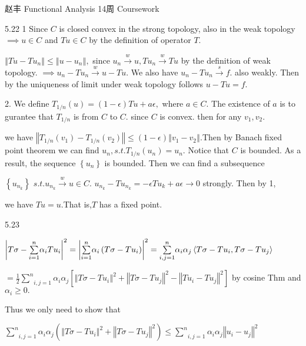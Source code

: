 \documentclass{article}
\begin{document}
\bigskip \bigskip \bigskip 赵丰\qquad \qquad
Functional Analysis 14周 Coursework

5.22 1 Since $C$ is closed convex in the strong topology, also in the weak
topology$\implies u\in C$ and $Tu\in C$ by the definition of operator $T.$

$\left\Vert Tu-Tu_{n}\right\Vert \leq \left\Vert u-u_{n}\right\Vert ,$ since 
$u_{n}\overset{w}{\rightarrow }u,Tu_{n}\overset{w}{\rightarrow }Tu$ by the
definition of weak topology. $\implies u_{n}-Tu_{n}\overset{w}{\rightarrow }%
u-Tu.$ We also have $u_{n}-Tu_{n}\overset{s}{\rightarrow }f.$ also weakly.
Then by the uniqueness of limit under weak topology follows $u-Tu=f.$

2. We define $T_{1/n}\left( u\right) =\left( 1-\epsilon \right) Tu+a\epsilon
,$ where $a\in C.$ The existence of $a$ is to gurantee that $T_{1/n}$ is
from $C$ to $C.$ since $C$ is convex. then for any $v_{1},v_{2}.$

we have $\left\Vert T_{1/n}\left( v_{1}\right) -T_{1/n}\left( v_{2}\right)
\right\Vert \leq \left( 1-\epsilon \right) \left\Vert v_{1}-v_{2}\right\Vert
.$Then by Banach fixed point theorem we can find $u_{n},s.t.T_{1/n}\left(
u_{n}\right) =u_{n}.$ Notice that $C$ is bounded. As a result, the sequence $%
\left\{ u_{n}\right\} $ is bounded. Then we can find a subsequence

$\left\{ u_{n_{k}}\right\} $ $s.t.u_{n_{k}}\overset{w}{\rightarrow }u\in C.$ 
$u_{n_{k}}-Tu_{n_{k}}=-\epsilon Tu_{k}+a\epsilon \rightarrow 0$ strongly.
Then by 1,

we have $Tu=u.$That is,$T$ has a fixed point.

5.23

$\left\vert T\sigma -\underset{i=1}{\overset{n}{\sum }}\alpha
_{i}Tu_{i}\right\vert ^{2}=\left\vert \underset{i=1}{\overset{n}{\sum }}%
\alpha _{i}\left( T\sigma -Tu_{i}\right) \right\vert ^{2}=\underset{i,j=1}{%
\overset{n}{\sum }}\alpha _{i}\alpha _{j}\left\langle T\sigma
-Tu_{i},T\sigma -Tu_{j}\right\rangle $

$=\frac{1}{2}\underset{i,j=1}{\overset{n}{\sum }}\alpha _{i}\alpha
_{j}[\left\Vert T\sigma -Tu_{i}\right\Vert ^{2}+\left\Vert T\sigma
-Tu_{j}\right\Vert ^{2}-\left\Vert Tu_{i}-Tu_{j}\right\Vert ^{2}]$ by cosine
Thm and $\alpha _{i}\geq 0.$

Thus we only need to show that 

$\underset{i,j=1}{\overset{n}{\sum }}\alpha _{i}\alpha _{j}\left( \left\Vert
T\sigma -Tu_{i}\right\Vert ^{2}+\left\Vert T\sigma -Tu_{j}\right\Vert
^{2}\right) \leq \underset{i,j=1}{\overset{n}{\sum }}\alpha _{i}\alpha
_{j}\left\Vert u_{i}-u_{j}\right\Vert ^{2}$
\end{document}
